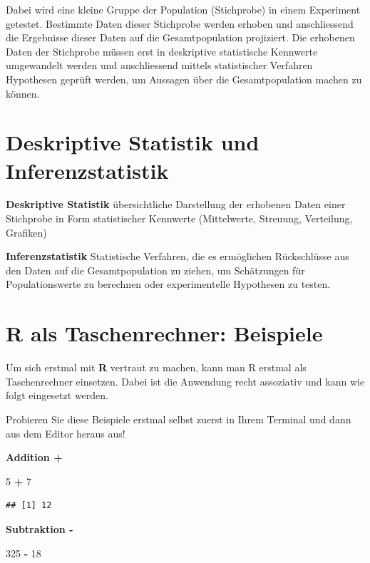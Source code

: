 \documentclass[]{book}
\newenvironment{Shaded}{\begin{snugshade}}{\end{snugshade}}
\newcommand{\DecValTok}[1]{\textcolor[rgb]{0.00,0.00,0.81}{#1}}
\newcommand{\StringTok}[1]{\textcolor[rgb]{0.31,0.60,0.02}{#1}}
\newcommand{\OperatorTok}[1]{\textcolor[rgb]{0.81,0.36,0.00}{\textbf{#1}}}
\begin{document}
Dabei wird eine kleine Gruppe der Population (Stichprobe) in einem
Experiment getestet. Bestimmte Daten dieser Stichprobe werden erhoben
und anschliessend die Ergebnisse dieser Daten auf die Gesamtpopulation
projiziert. Die erhobenen Daten der Stichprobe müssen erst in
deskriptive statistische Kennwerte umgewandelt werden und anschliessend
mittels statistischer Verfahren Hypothesen geprüft werden, um Aussagen
über die Gesamtpopulation machen zu können.

\section{Deskriptive Statistik und
Inferenzstatistik}\label{deskriptive-statistik-und-inferenzstatistik}

\textbf{Deskriptive Statistik} übersichtliche Darstellung der erhobenen
Daten einer Stichprobe in Form statistischer Kennwerte (Mittelwerte,
Streuung, Verteilung, Grafiken)

\textbf{Inferenzstatistik} Statistische Verfahren, die es ermöglichen
Rückschlüsse aus den Daten auf die Gesamtpopulation zu ziehen, um
Schätzungen für Populationswerte zu berechnen oder experimentelle
Hypothesen zu testen.

\section{R als Taschenrechner:
Beispiele}\label{r-als-taschenrechner-beispiele}

Um sich erstmal mit \textbf{R} vertraut zu machen, kann man R erstmal
als Taschenrechner einsetzen. Dabei ist die Anwendung recht assoziativ
und kann wie folgt eingesetzt werden.

Probieren Sie diese Beispiele erstmal selbst zuerst in Ihrem Terminal
und dann aus dem Editor heraus aus!

\textbf{Addition + }

\begin{Shaded}
\begin{Highlighting}[]
\DecValTok{5} \OperatorTok{+}\StringTok{ }\DecValTok{7}
\end{Highlighting}
\end{Shaded}

\begin{verbatim}
## [1] 12
\end{verbatim}

\textbf{Subtraktion - }

\begin{Shaded}
\begin{Highlighting}[]
\DecValTok{325} \OperatorTok{-}\StringTok{ }\DecValTok{18}
\end{Highlighting}
\end{Shaded}
\end{document}
